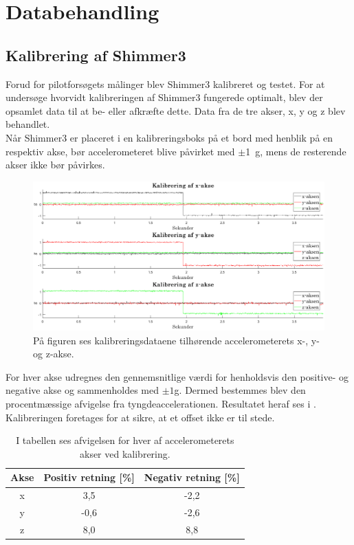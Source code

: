 \section{Databehandling}
\subsection{Kalibrering af Shimmer3}
Forud for pilotforsøgets målinger blev Shimmer3 kalibreret og testet. For at undersøge hvorvidt kalibreringen af Shimmer3 fungerede optimalt, blev der opsamlet data til at be- eller afkræfte dette. Data fra de tre akser, x, y og z blev behandlet. \\
Når Shimmer3 er placeret i en kalibreringsboks på et bord med henblik på en respektiv akse, bør accelerometeret blive påvirket med $\pm$1~g, mens de resterende akser ikke bør påvirkes.
\begin{figure}[H]
	\centering
	\includegraphics[width=.85\textwidth]{figures/qBilag/kalibreringsdata}
	\caption{På figuren ses kalibreringsdataene tilhørende accelerometerets x-, y- og z-akse.}
	\label{fig:Ap_Kalibrering}
\end{figure}\vspace{-.45cm}
For hver akse udregnes den gennemsnitlige værdi for henholdsvis den positive- og negative akse og sammenholdes med $\pm 1$g. Dermed bestemmes blev den procentmæssige afvigelse fra tyngdeaccelerationen. Resultatet heraf ses i . Kalibreringen foretages for at sikre, at et offset ikke er til stede. 
\begin{table}[H]
	\centering
	\begin{tabular}{ccc}		\hline
		\rowcolor[HTML]{C0C0C0} Akse & Positiv retning {[}\%{]} & Negativ retning {[}\%{]} \\ \hline
		x & 3,5 & -2,2 \\ \hline
		y & -0,6 & -2,6 \\ \hline
		z & 8,0 & 8,8 \\ \hline
	\end{tabular}
	\caption{I tabellen ses afvigelsen for hver af accelerometerets akser ved kalibrering.}
	\label{fig:akser_pilot}
\end{table}\vspace{-.40cm}

